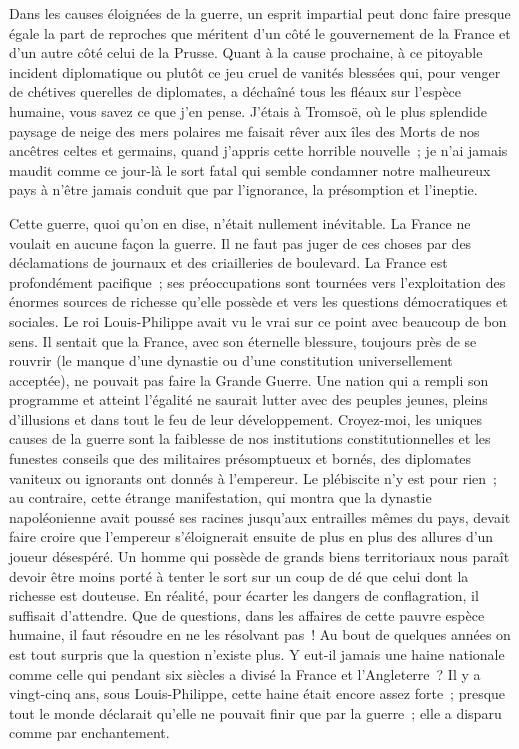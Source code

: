 \documentclass[french,twoside]{book} %
\begin{document}
\noindent Dans les causes éloignées de la guerre, un esprit impartial peut donc faire presque égale la part de reproches que méritent d’un côté le gouvernement de la France et d’un autre côté celui de la Prusse. Quant à la cause prochaine, à ce pitoyable incident diplomatique ou plutôt ce jeu cruel de vanités blessées qui, pour venger de chétives querelles de diplomates, a déchaîné tous les fléaux sur l’espèce humaine, vous savez ce que j’en pense. J’étais à Tromsoë, où le plus splendide paysage de neige des mers polaires me faisait rêver aux îles des Morts de nos ancêtres celtes et germains, quand j’appris cette horrible nouvelle ; je n’ai jamais maudit comme ce jour-là le sort fatal qui semble condamner notre malheureux pays à n’être jamais conduit que par l’ignorance, la présomption et l’ineptie.\par
Cette guerre, quoi qu’on en dise, n’était nullement inévitable. La France ne voulait en aucune façon la guerre. Il ne faut pas juger de ces choses par des déclamations de journaux et des criailleries de boulevard. La France est profondément pacifique ; ses préoccupations sont tournées vers l’exploitation des énormes sources de richesse qu’elle possède et vers les questions démocratiques et sociales. Le roi Louis-Philippe avait vu le vrai sur ce point avec beaucoup de bon sens. Il sentait que la France, avec son éternelle blessure, toujours près de se rouvrir (le manque d’une dynastie ou d’une constitution universellement acceptée), ne pouvait pas faire la Grande Guerre. Une nation qui a rempli son programme et atteint l’égalité ne saurait lutter avec des peuples jeunes, pleins d’illusions et dans tout le feu de leur développement. Croyez-moi, les uniques causes de la guerre sont la faiblesse de nos institutions constitutionnelles et les funestes conseils que des militaires présomptueux et bornés, des diplomates vaniteux ou ignorants ont donnés à l’empereur. Le plébiscite n’y est pour rien ; au contraire, cette étrange manifestation, qui montra que la dynastie napoléonienne avait poussé ses racines jusqu’aux entrailles mêmes du pays, devait faire croire que l’empereur s’éloignerait ensuite de plus en plus des allures d’un joueur désespéré. Un homme qui possède de grands biens territoriaux nous paraît devoir être moins porté à tenter le sort sur un coup de dé que celui dont la richesse est douteuse. En réalité, pour écarter les dangers de conflagration, il suffisait d’attendre. Que de questions, dans les affaires de cette pauvre espèce humaine, il faut résoudre en ne les résolvant pas ! Au bout de quelques années on est tout surpris que la question n’existe plus. Y eut-il jamais une haine nationale comme celle qui pendant six siècles a divisé la France et l’Angleterre ? Il y a vingt-cinq ans, sous Louis-Philippe, cette haine était encore assez forte ; presque tout le monde déclarait qu’elle ne pouvait finir que par la guerre ; elle a disparu comme par enchantement.\par
\end{document}
